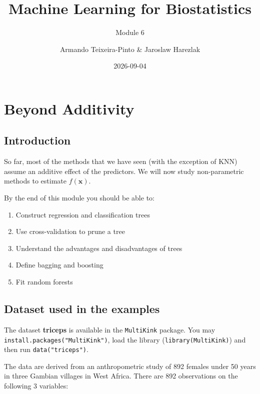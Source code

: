 \documentclass[
]{book}
\title{Machine Learning for Biostatistics}
\subtitle{Module 6}
\author{Armando Teixeira-Pinto \& Jaroslaw Harezlak}
\date{2026-09-04}
\providecommand{\tightlist}{%
  \setlength{\itemsep}{0pt}\setlength{\parskip}{0pt}}
\begin{document}
\maketitle

{
\setcounter{tocdepth}{1}
\tableofcontents
}
\chapter*{Beyond Additivity}\label{beyond-additivity}

\section*{Introduction}\label{introduction}

So far, most of the methods that we have seen (with the exception of KNN) assume
an additive effect of the predictors. We will now study non-parametric methods
to estimate \(f(\mathbf x)\).

By the end of this module you should be able to:

\begin{enumerate}
\def\labelenumi{\arabic{enumi}.}
\tightlist
\item
  Construct regression and classification trees
\item
  Use cross-validation to prune a tree
\item
  Understand the advantages and disadvantages of trees
\item
  Define bagging and boosting
\item
  Fit random forests
\end{enumerate}

\section*{Dataset used in the examples}\label{dataset-used-in-the-examples}

The dataset \textbf{triceps} is available in the \texttt{MultiKink} package.
You may \texttt{install.packages("MultiKink")}, load the library (\texttt{library(MultiKink)})
and then run \texttt{data("triceps")}.

The data are derived from an anthropometric study of 892 females under 50 years
in three Gambian villages in West Africa. There are 892 observations
on the following 3 variables:
\end{document}

